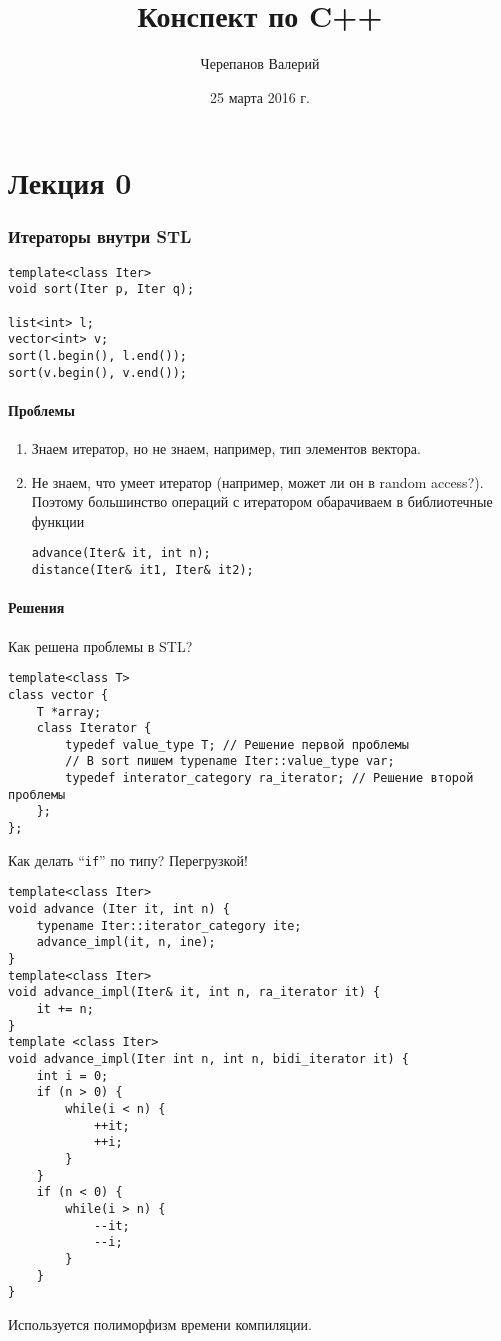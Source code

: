 \documentclass[a4paper,12pt]{article}
\title{Конспект по C++}
\author{Черепанов Валерий}
\date{25 марта 2016 г.}
\newcommand{\cc}{\texttt}
\begin{document}
\maketitle
\part{Лекция 0}

\section{Итераторы внутри STL}

\begin{verbatim}
template<class Iter>
void sort(Iter p, Iter q);

list<int> l;
vector<int> v;
sort(l.begin(), l.end());
sort(v.begin(), v.end());
\end{verbatim}

\subsection*{Проблемы}
\begin{enumerate}
    \item Знаем итератор, но не знаем, например, тип элементов вектора.
    \item Не знаем, что умеет итератор (например, может ли он в random access?). Поэтому большинство операций с итератором обарачиваем в библиотечные функции
    \begin{verbatim}
advance(Iter& it, int n);
distance(Iter& it1, Iter& it2);
    \end{verbatim}
\end{enumerate}

\subsection*{Решения}
Как решена проблемы в STL?
\begin{verbatim}
template<class T>
class vector {
    T *array;
    class Iterator {
        typedef value_type T; // Решение первой проблемы
        // В sort пишем typename Iter::value_type var; 
        typedef interator_category ra_iterator; // Решение второй проблемы
    };
};
\end{verbatim}

Как делать ``\cc{if}'' по типу? Перегрузкой!
\begin{verbatim}
template<class Iter>
void advance (Iter it, int n) {
    typename Iter::iterator_category ite;
    advance_impl(it, n, ine);
}
template<class Iter>
void advance_impl(Iter& it, int n, ra_iterator it) {
    it += n;
}
template <class Iter>
void advance_impl(Iter int n, int n, bidi_iterator it) {
    int i = 0;
    if (n > 0) {
        while(i < n) {
            ++it;
            ++i;
        }
    }
    if (n < 0) {
        while(i > n) {
            --it;
            --i;
        }
    }
}
\end{verbatim}
Используется полиморфизм времени компиляции. %
\end{document}
